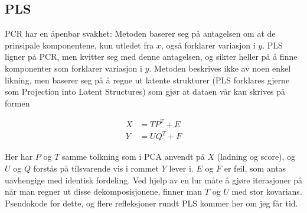\subsection{PLS}
PCR har en åpenbar svakhet: Metoden baserer seg på antagelsen om at de prinsipale komponentene, kun utledet fra $x$, også forklarer variasjon i $y$. PLS ligner på PCR, men kvitter seg med denne antagelsen, og sikter heller på å finne komponenter som forklarer variasjon i $y$. Metoden beskrives ikke av noen enkel likning, men baserer seg på å regne ut latente strukturer (PLS forklares gjerne som Projection into Latent Structures) som gjør at dataen vår kan skrives på formen

\begin{align}
	X & = T P^T + E \\
	Y & = U Q^T + F
\end{align}

Her har $P$ og $T$ samme tolkning som i PCA anvendt på $X$ (ladning og score), og $U$ og $Q$ forstås på tilsvarende vis i rommet $Y$ lever i. $E$ og $F$ er feil, som antas uavhengige med identisk fordeling. Ved hjelp av en lur måte å gjøre iterasjoner på når man regner ut disse dekomposisjonene, finner man $T$ og $U$ med stor kovarians. Pseudokode for dette, og flere refleksjoner rundt PLS kommer her om jeg får tid.

